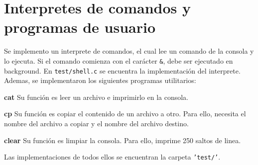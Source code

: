 \section{Interpretes de comandos y programas de usuario}
Se implemento un interprete de comandos, el cual lee un comando de la consola y lo ejecuta. Si el comando comienza con el carácter \texttt{\&}, debe ser ejecutado en background. En \texttt{test/shell.c} se encuentra la implementación del interprete.\\
Ademas, se implementaron los siguientes programas utilitarios:
\begin{description}
    \item \textbf{cat} Su función es leer un archivo e imprimirlo en la consola.
    \item \textbf{cp} Su función es copiar el contenido de un archivo a otro. Para ello, necesita el nombre del archivo a copiar y el nombre del archivo destino.
    \item \textbf{clear} Su función es limpiar la consola. Para ello, imprime 250 saltos de linea.
\end{description}
Las implementaciones de todos ellos se encuentran la carpeta \texttt{'test/'}.